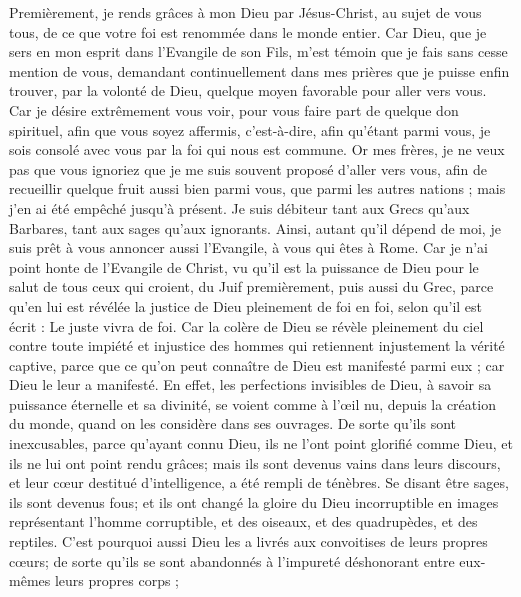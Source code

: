\begin{multicols}{2}
Premièrement, je rends grâces à mon Dieu par Jésus-Christ, au sujet de vous tous, de ce que votre foi est renommée dans le monde entier.
Car Dieu, que je sers en mon esprit dans l'Evangile de son Fils, m'est témoin que je fais sans cesse mention de vous,
demandant continuellement dans mes prières que je puisse enfin trouver, par la volonté de Dieu, quelque moyen favorable pour aller vers vous.
Car je désire extrêmement vous voir, pour vous faire part de quelque don spirituel, afin que vous soyez affermis,
c'est-à-dire, afin qu'étant parmi vous, je sois consolé avec vous par la foi qui nous est commune.
Or mes frères, je ne veux pas que vous ignoriez que je me suis souvent proposé d'aller vers vous, afin de recueillir quelque fruit aussi bien parmi vous, que parmi les autres nations ; mais j'en ai été empêché jusqu'à présent.
Je suis débiteur tant aux Grecs qu'aux Barbares, tant aux sages qu'aux ignorants.
Ainsi, autant qu'il dépend de moi, je suis prêt à vous annoncer aussi l'Evangile, à vous qui êtes à Rome.
Car je n'ai point honte de l'Evangile de Christ, vu qu'il est la puissance de Dieu pour le salut de tous ceux qui croient, du Juif premièrement, puis aussi du Grec,
parce qu'en lui est révélée la justice de Dieu pleinement de foi en foi, selon qu'il est écrit : Le juste vivra de foi.
Car la colère de Dieu se révèle pleinement du ciel contre toute impiété et injustice des hommes qui retiennent injustement la vérité captive,
parce que ce qu'on peut connaître de Dieu est manifesté parmi eux ; car Dieu le leur a manifesté.
En effet, les perfections invisibles de Dieu, à savoir sa puissance éternelle et sa divinité, se voient comme à l'œil nu, depuis la création du monde, quand on les considère dans ses ouvrages. De sorte qu'ils sont inexcusables,
parce qu'ayant connu Dieu, ils ne l'ont point glorifié comme Dieu, et ils ne lui ont point rendu grâces; mais ils sont devenus vains dans leurs discours, et leur cœur destitué d'intelligence, a été rempli de ténèbres.
Se disant être sages, ils sont devenus fous;
et ils ont changé la gloire du Dieu incorruptible en images représentant l'homme corruptible, et des oiseaux, et des quadrupèdes, et des reptiles.
C'est pourquoi aussi Dieu les a livrés aux convoitises de leurs propres cœurs; de sorte qu'ils se sont abandonnés à l'impureté déshonorant entre eux-mêmes leurs propres corps ;

\end{multicols}
